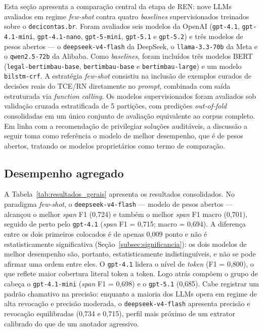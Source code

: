 Esta seção apresenta a comparação central da etapa de REN: nove LLMs avaliados em regime \textit{few-shot} contra quatro \textit{baselines} supervisionados treinados sobre o \texttt{decicontas.br}. Foram avaliados seis modelos da OpenAI (\texttt{gpt-4.1}, \texttt{gpt-4.1-mini}, \texttt{gpt-4.1-nano}, \texttt{gpt-5-mini}, \texttt{gpt-5.1} e \texttt{gpt-5.2}) e três modelos de pesos abertos --- o \texttt{deepseek-v4-flash} da DeepSeek, o \texttt{llama-3.3-70b} da Meta e o \texttt{qwen2.5-72b} da Alibaba. Como \textit{baselines}, foram incluídos três modelos BERT (\texttt{legal-bertimbau-base}, \texttt{bertimbau-base} e \texttt{bertimbau-large}) e um modelo \texttt{bilstm-crf}. A estratégia \textit{few-shot} consistiu na inclusão de exemplos curados de decisões reais do TCE/RN diretamente no \textit{prompt}, combinada com saída estruturada via \textit{function calling}. Os modelos supervisionados foram avaliados sob validação cruzada estratificada de 5 partições, com predições \textit{out-of-fold} consolidadas em um único conjunto de avaliação equivalente ao corpus completo. Em linha com a recomendação de privilegiar soluções auditáveis, a discussão a seguir toma como referência o modelo de melhor desempenho, que é de pesos abertos, tratando os modelos proprietários como termo de comparação.

\subsection{Desempenho agregado}
\label{subsec:desempenho_agregado}

A Tabela~\ref{tab:resultados_gerais} apresenta os resultados consolidados. No paradigma \textit{few-shot}, o \texttt{deepseek-v4-flash} --- modelo de pesos abertos --- alcançou o melhor \textit{span} F1 (0,724) e também o melhor \textit{span} F1 macro (0,701), seguido de perto pelo \texttt{gpt-4.1} (\textit{span} F1 = 0,715; macro = 0,694). A diferença entre os dois primeiros colocados é de apenas 0,009 ponto e não é estatisticamente significativa (Seção~\ref{subsec:significancia}): os dois modelos de melhor desempenho são, portanto, estatisticamente indistinguíveis, e não se pode afirmar uma ordem entre eles. O \texttt{gpt-4.1} lidera o nível de \textit{token} (F1 = 0,800), o que reflete maior cobertura literal token a token. Logo atrás compõem o grupo de cabeça o \texttt{gpt-4.1-mini} (\textit{span} F1 = 0,698) e o \texttt{gpt-5.1} (0,685). Cabe registrar um padrão chamativo na precisão: enquanto a maioria dos LLMs opera em regime de alta revocação e precisão moderada, o \texttt{deepseek-v4-flash} apresenta precisão e revocação equilibradas (0,734 e 0,715), perfil mais próximo de um extrator calibrado do que de um anotador agressivo.

